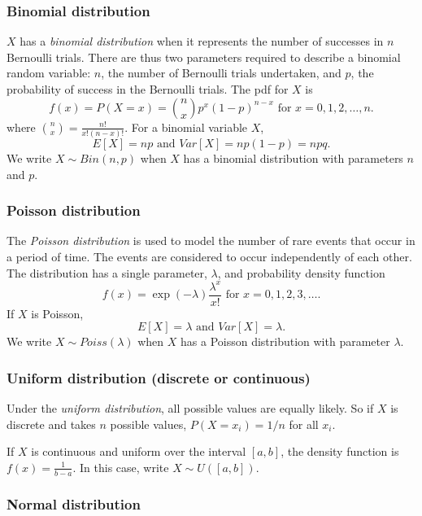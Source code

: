 \documentclass[11pt]{article}
\begin{document}
\subsubsection{Binomial distribution}

\label{sec:binom}

$X$ has a {\em binomial distribution} when it represents the number of successes in $n$ Bernoulli trials.  There are thus two parameters required to describe a binomial random variable:  $n$, the number of Bernoulli trials undertaken, and $p$, the probability of success in the Bernoulli trials.  The pdf for $X$ is 
\[ f(x)  = P(X = x) = {n \choose x} p^x (1-p)^{n-x} \mbox{ for } x = 0,1,2,\ldots,  n.\]
where ${n \choose x} = \frac{n!}{x!(n-x)!}.$  For a binomial variable $X$,
\[ E[X] = np \mbox{ and } Var[X] = np(1-p) = npq. \]
We write $X \sim Bin(n,p)$ when $X$ has a binomial distribution with parameters $n$ and $p$.


\subsubsection{Poisson distribution}

The {\em Poisson distribution} is used to model the number of rare events that occur in a period of time.  The events are considered to occur independently of each other.  The distribution has a single parameter, $\lambda$, and probability density function \[f(x) = \exp(-\lambda) \frac{\lambda^x}{x!} \mbox{ for } x = 0,1,2,3,\ldots.\]   If $X$ is Poisson, 
\[ E[X] = \lambda \mbox{ and } Var[X] = \lambda. \] 
We write $X \sim Poiss(\lambda)$ when $X$ has a Poisson distribution with parameter $\lambda$.

\subsubsection{Uniform  distribution (discrete or continuous)}


Under the {\em uniform distribution}, all possible values are equally likely.  So if $X$ is discrete and takes $n$ possible values, $P(X = x_i) = 1/n$ for all $x_i$.  

If $X$ is continuous and uniform over the interval $[a,b]$, the density function is $f(x) = \frac{1}{b-a}$.  In this case, write $X \sim U([a,b])$.


\subsubsection{Normal distribution}
\end{document}
